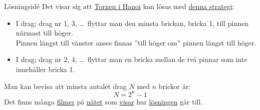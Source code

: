 \documentclass{lecturenotes}
\begin{document}
\begin{Slide}{Lösningsidé}
Det visar sig att \href{https://sv.wikipedia.org/wiki/Tornen_i_Hanoi}{Tornen i Hanoi} kan lösas med \href{https://en.wikipedia.org/wiki/Tower\_of\_Hanoi\#Non-recursive_solution}{denna strategi}:
\begin{itemize}
 \item I  drag; drag nr 1, 3, \ldots\  flyttar man den minsta brickan, bricka 1, till pinnen närmast till höger. \\ Pinnen längst till vänster anses finnas ''till höger om'' pinnen längst till höger.
 \item I  drag; drag nr 2, 4, \ldots\  flyttar man en bricka mellan de två pinnar som inte innehåller bricka 1.
\end{itemize}
\pause
\vspace{2em}
Man kan bevisa att minsta antalet drag $N$ med $n$ brickor är: 
\begin{equation*}
N = 2^n - 1
\end{equation*}
\pause
Det finns många \href{https://www.youtube.com/watch?v=w9LgLiW9YHU}{filmer} på \href{https://www.youtube.com/watch?v=UMPneeBzQHk}{nätet} som \href{https://www.youtube.com/watch?v=h8JPtWpctl4}{visar} hur \href{https://www.youtube.com/watch?v=xUiDT3CjA40}{lösningen} går till.
\end{Slide} 

\end{document}
